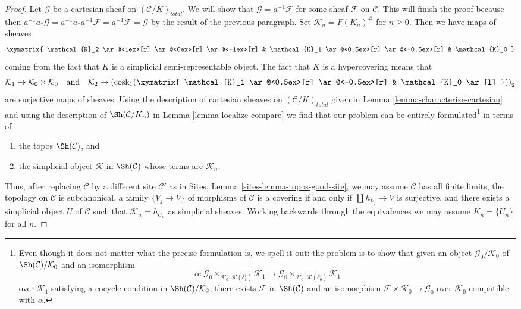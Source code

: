 \begin{proof}
\medskip\noindent
Let $\mathcal{G}$ be a cartesian sheaf on $(\mathcal{C}/K)_{total}$.
We will show that $\mathcal{G} = a^{-1}\mathcal{F}$ for some sheaf
$\mathcal{F}$ on $\mathcal{C}$. This will finish the proof because
then $a^{-1}a_*\mathcal{G} = a^{-1}a_*a^{-1}\mathcal{F} =
a^{-1}\mathcal{F} = \mathcal{G}$ by the result of the previous paragraph.
Set $\mathcal{K}_n = F(K_n)^\#$ for $n \geq 0$. Then we have maps of sheaves
$$
\xymatrix{
\mathcal{K}_2
\ar@<1ex>[r]
\ar@<0ex>[r]
\ar@<-1ex>[r]
&
\mathcal{K}_1
\ar@<0.5ex>[r]
\ar@<-0.5ex>[r]
&
\mathcal{K}_0
}
$$
coming from the fact that $K$ is a simplicial semi-representable object.
The fact that $K$ is a hypercovering means that
$$
\mathcal{K}_1 \to \mathcal{K}_0 \times \mathcal{K}_0
\quad\text{and}\quad
\mathcal{K}_2 \to
\left(\text{cosk}_1(
\xymatrix{
\mathcal{K}_1
\ar@<0.5ex>[r]
\ar@<-0.5ex>[r]
&
\mathcal{K}_0 \ar[l]
})\right)_2
$$
are surjective maps of sheaves. Using the description of cartesian sheaves on
$(\mathcal{C}/K)_{total}$ given in Lemma \ref{lemma-characterize-cartesian}
and using the description of $\Sh(\mathcal{C}/K_n)$ in
Lemma \ref{lemma-localize-compare}
we find that our problem can be entirely formulated\footnote{Even though it
does not matter what the precise formulation is, we spell it out:
the problem is to show that given an object
$\mathcal{G}_0/\mathcal{K}_0$ of $\Sh(\mathcal{C})/\mathcal{K}_0$
and an isomorphism
$$
\alpha :
\mathcal{G}_0 \times_{\mathcal{K}_0, \mathcal{K}(\delta^1_1)} \mathcal{K}_1 \to
\mathcal{G}_0 \times_{\mathcal{K}_0, \mathcal{K}(\delta^1_0)} \mathcal{K}_1
$$
over $\mathcal{K}_1$ satisfying a cocycle condition in
$\Sh(\mathcal{C})/\mathcal{K}_2$, there exists
$\mathcal{F}$ in $\Sh(\mathcal{C})$ and an isomorphism
$\mathcal{F} \times \mathcal{K}_0 \to \mathcal{G}_0$ over $\mathcal{K}_0$
compatible with $\alpha$.} in terms of
\begin{enumerate}
\item the topos $\Sh(\mathcal{C})$, and
\item the simplicial object $\mathcal{K}$ in $\Sh(\mathcal{C})$
whose terms are $\mathcal{K}_n$.
\end{enumerate}
Thus, after replacing $\mathcal{C}$ by a different site $\mathcal{C}'$
as in Sites, Lemma \ref{sites-lemma-topos-good-site}, we may assume
$\mathcal{C}$ has all finite limits,
the topology on $\mathcal{C}$ is subcanonical,
a family $\{V_j \to V\}$ of morphisms of $\mathcal{C}$
is a covering if and only if $\coprod h_{V_j} \to V$ is surjective, and
there exists a simplicial object $U$ of $\mathcal{C}$
such that $\mathcal{K}_n = h_{U_n}$ as simplicial sheaves.
Working backwards through the equivalences we may assume
$K_n = \{U_n\}$ for all $n$.


\end{proof}
